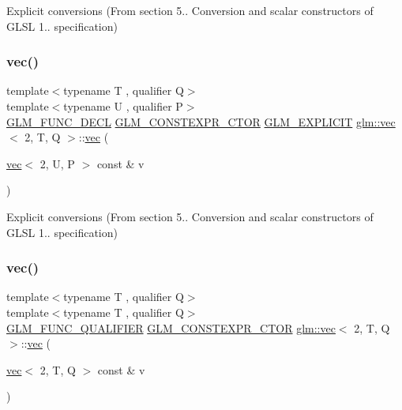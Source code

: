 Explicit conversions (From section 5.. Conversion and scalar constructors of G\+L\+SL 1.. specification) 

\mbox{\label{structglm_1_1vec_3_012_00_01_t_00_01_q_01_4_a55d77d8b7320875815bfe34fd59823af}} 
\subsubsection{\texorpdfstring{vec()}{vec()}\hspace{0.1cm}{\footnotesize\ttfamily [10/17]}}
{\footnotesize\ttfamily template$<$typename T , qualifier Q$>$ \\
template$<$typename U , qualifier P$>$ \\
\mbox{\hyperlink{setup_8hpp_ab2d052de21a70539923e9bcbf6e83a51}{G\+L\+M\+\_\+\+F\+U\+N\+C\+\_\+\+D\+E\+CL}} \mbox{\hyperlink{setup_8hpp_ad34178a09666081abdb573c14d1f4a5a}{G\+L\+M\+\_\+\+C\+O\+N\+S\+T\+E\+X\+P\+R\+\_\+\+C\+T\+OR}} \mbox{\hyperlink{setup_8hpp_a6c74f5a5e7b134ab69023ff9a30d4d5d}{G\+L\+M\+\_\+\+E\+X\+P\+L\+I\+C\+IT}} \mbox{\hyperlink{structglm_1_1vec}{glm\+::vec}}$<$ 2, T, Q $>$\+::\mbox{\hyperlink{structglm_1_1vec}{vec}} (\begin{DoxyParamCaption}\item[{\mbox{\hyperlink{structglm_1_1vec}{vec}}$<$ 2, U, P $>$ const \&}]{v }\end{DoxyParamCaption})}



Explicit conversions (From section 5.. Conversion and scalar constructors of G\+L\+SL 1.. specification) 

\mbox{\label{structglm_1_1vec_3_012_00_01_t_00_01_q_01_4_a1dc70d40254a106cf1589d2fb91cadf8}} 
\subsubsection{\texorpdfstring{vec()}{vec()}\hspace{0.1cm}{\footnotesize\ttfamily [11/17]}}
{\footnotesize\ttfamily template$<$typename T , qualifier Q$>$ \\
template$<$typename T , qualifier Q$>$ \\
\mbox{\hyperlink{setup_8hpp_a33fdea6f91c5f834105f7415e2a64407}{G\+L\+M\+\_\+\+F\+U\+N\+C\+\_\+\+Q\+U\+A\+L\+I\+F\+I\+ER}} \mbox{\hyperlink{setup_8hpp_ad34178a09666081abdb573c14d1f4a5a}{G\+L\+M\+\_\+\+C\+O\+N\+S\+T\+E\+X\+P\+R\+\_\+\+C\+T\+OR}} \mbox{\hyperlink{structglm_1_1vec}{glm\+::vec}}$<$ 2, T, Q $>$\+::\mbox{\hyperlink{structglm_1_1vec}{vec}} (\begin{DoxyParamCaption}\item[{\mbox{\hyperlink{structglm_1_1vec}{vec}}$<$ 2, T, Q $>$ const \&}]{v }\end{DoxyParamCaption})}



